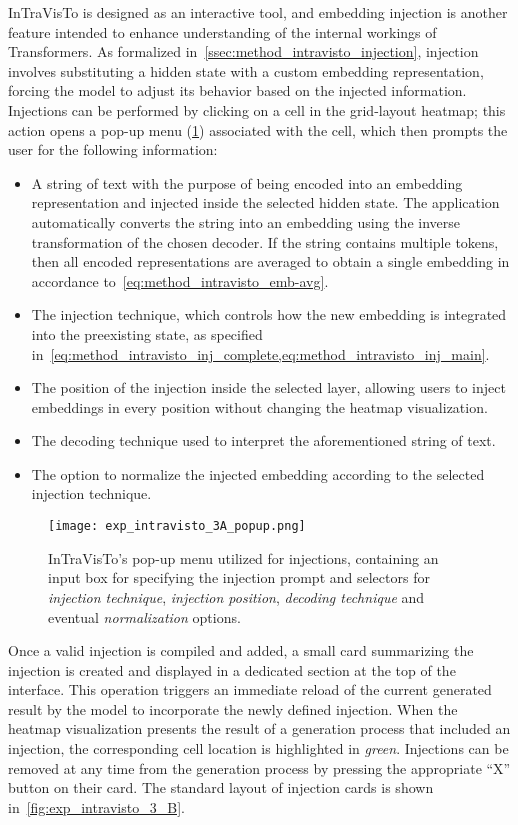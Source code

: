 InTraVisTo is designed as an interactive tool, and embedding injection is another feature intended to enhance understanding of the internal workings of Transformers.
As formalized in~\cref{ssec:method_intravisto_injection}, injection involves substituting a hidden state with a custom embedding representation, forcing the model to adjust its behavior based on the injected information.
Injections can be performed by clicking on a cell in the grid-layout heatmap; this action opens a pop-up menu (\cref{fig:exp_intravisto_3_A}) associated with the cell, which then prompts the user for the following information:
\begin{itemize}
    \item A string of text with the purpose of being encoded into an embedding representation and injected inside the selected hidden state.
The application automatically converts the string into an embedding using the inverse transformation of the chosen decoder.
If the string contains multiple tokens, then all encoded representations are averaged to obtain a single embedding in accordance to~\cref{eq:method_intravisto_emb-avg}.
    \item The injection technique, which controls how the new embedding is integrated into the preexisting state, as specified in~\cref{eq:method_intravisto_inj_complete,eq:method_intravisto_inj_main}.
    \item The position of the injection inside the selected layer, allowing users to inject embeddings in every position without changing the heatmap visualization.
    \item The decoding technique used to interpret the aforementioned string of text.
    \item The option to normalize the injected embedding according to the selected injection technique.
\end{itemize}

\begin{figure}[t!]
    \centering
    \texttt{[image: exp\_intravisto\_3A\_popup.png]}
    \caption[InTraVisTo's pop-up menu utilized for injections.]{InTraVisTo's pop-up menu utilized for injections, containing an input box for specifying the injection prompt and selectors for \emph{injection technique}, \emph{injection position}, \emph{decoding technique} and eventual \emph{normalization} options.}
    \label{fig:exp_intravisto_3_A}
\end{figure}

Once a valid injection is compiled and added, a small card summarizing the injection is created and displayed in a dedicated section at the top of the interface.
This operation triggers an immediate reload of the current generated result by the model to incorporate the newly defined injection.
When the heatmap visualization presents the result of a generation process that included an injection, the corresponding cell location is highlighted in \emph{green}.
Injections can be removed at any time from the generation process by pressing the appropriate ``X'' button on their card.
The standard layout of injection cards is shown in~\cref{fig:exp_intravisto_3_B}.

